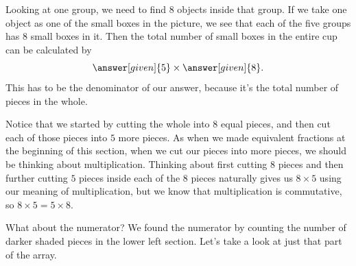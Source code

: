\documentclass{ximera}
\begin{document}
\begin{example}
\begin{image}
\end{image}

Looking at one group, we need to find $8$ objects inside that group. If we take one object as one of the small boxes in the picture, we see that each of the five groups has $8$ small boxes in it. Then the total number of small boxes in the entire cup can be calculated by 
\[
\answer[given]{5} \times \answer[given]{8}.
\]
This has to be the denominator of our answer, because it's the total number of pieces in the whole. 

Notice that we started by cutting the whole into $8$ equal pieces, and then cut each of those pieces into $5$ more pieces. As when we made equivalent fractions at the beginning of this section, when we cut our pieces into more pieces, we should be thinking about multiplication. Thinking about first cutting $8$ pieces and then further cutting $5$ pieces inside each of the $8$ pieces naturally gives us $8 \times 5$ using our meaning of multiplication, but we know that multiplication is commutative, so $8 \times 5 = 5 \times 8$. 

What about the numerator? We found the numerator by counting the number of darker shaded pieces in the lower left section. Let's take a look at just that part of the array.
\begin{image}
\end{image}


\end{example}
\end{document}
